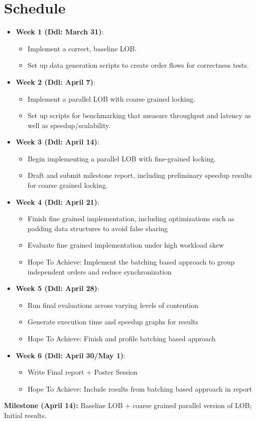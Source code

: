 \documentclass[11pt]{article}
\begin{document}
\section*{Schedule}
\begin{itemize}
    \item \textbf{Week 1 (Ddl: March 31)}: 
    \begin{itemize}
        \item Implement a correct, baseline LOB. 
        \item Set up data generation scripts to create order flows for correctness tests.
    \end{itemize}
    \item \textbf{Week 2 (Ddl: April 7)}: 
    \begin{itemize}
        \item Implement a parallel LOB with coarse grained locking. 
        \item Set up scripts for benchmarking that measure throughput and latency as well as speedup/scalability.
    \end{itemize}
    \item \textbf{Week 3 (Ddl: April 14)}: 
    \begin{itemize}
        \item Begin implementing a parallel LOB with fine-grained locking. 
        \item Draft and submit milestone report, including preliminary speedup results for coarse grained locking.
    \end{itemize}
    \item \textbf{Week 4 (Ddl: April 21)}: 
    \begin{itemize}
        \item Finish fine grained implementation, including optimizations such as padding data structures to avoid false sharing 
        \item Evaluate fine grained implementation under high workload skew
        \item Hope To Achieve: Implement the batching based approach to group independent orders and reduce synchronization
    \end{itemize}
    \item \textbf{Week 5 (Ddl: April 28)}: 
    \begin{itemize}
        \item Run final evaluations across varying levels of contention
        \item Generate execution time and speedup graphs for results
        \item Hope To Achieve: Finish and profile batching based approach
    \end{itemize}
    \item \textbf{Week 6 (Ddl: April 30/May 1)}: 
    \begin{itemize}
        \item Write Final report + Poster Session
        \item Hope To Achieve: Include results from batching based approach in report
    \end{itemize}
\end{itemize}

\textbf{Milestone (April 14):} Baseline LOB + coarse grained parallel version of LOB; Initial results.
\end{document}
